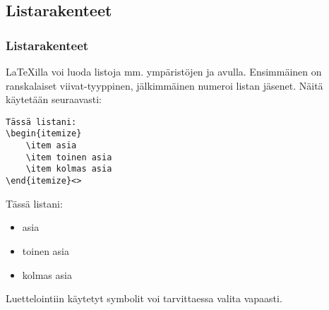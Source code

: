\subsection{Listarakenteet}
\begin{fframe}
    \frametitle{Listarakenteet}
    \LaTeX illa voi luoda listoja mm. ympäristöjen  ja  avulla. Ensimmäinen on ranskalaiset viivat-tyyppinen, jälkimmäinen numeroi listan jäsenet. Näitä käytetään seuraavasti:
    \vaihto
    \begin{minipage}{5cm}
        \begin{lstlisting}
Tässä listani:
\begin{itemize}
    \item asia
    \item toinen asia
    \item kolmas asia
\end{itemize}<>
        \end{lstlisting}
    \end{minipage}
    \begin{minipage}{5cm}
        \begin{serif}
            Tässä listani:
            \begin{itemize}
                \item[\textcolor{black}{\textbullet}] asia
                \item[\textcolor{black}{\textbullet}] toinen asia
                \item[\textcolor{black}{\textbullet}] kolmas asia
            \end{itemize}
        \end{serif}
    \end{minipage}
    \vaihto
    Luettelointiin käytetyt symbolit voi tarvittaessa valita vapaasti. 
\end{fframe}

